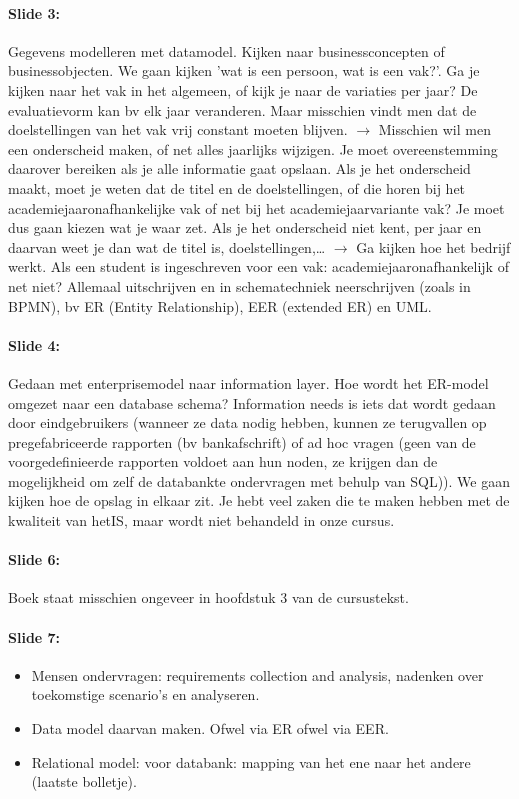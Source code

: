 \documentclass[10pt,a4paper]{report}
\begin{document}
\paragraph{Slide 3:}Gegevens modelleren met datamodel. Kijken naar businessconcepten of businessobjecten. We gaan kijken 'wat is een persoon, wat is een vak?'. Ga je kijken naar het vak in het algemeen, of kijk je naar de variaties per jaar? De evaluatievorm kan bv elk jaar veranderen. Maar misschien vindt men dat de doelstellingen van het vak vrij constant moeten blijven. $\rightarrow$ Misschien wil men een onderscheid maken, of net alles jaarlijks wijzigen. Je moet overeenstemming daarover bereiken als je alle informatie gaat opslaan. Als je het onderscheid maakt, moet je weten dat de titel en de doelstellingen, of die horen bij het academiejaaronafhankelijke vak of net bij het academiejaarvariante vak? Je moet dus gaan kiezen wat je waar zet. Als je het onderscheid niet kent, per jaar en daarvan weet je dan wat de titel is, doelstellingen,… $\rightarrow$ Ga kijken hoe het bedrijf werkt. Als een student is ingeschreven voor een vak: academiejaaronafhankelijk of net niet? Allemaal uitschrijven en in schematechniek neerschrijven (zoals in BPMN), bv ER (Entity Relationship), EER (extended ER) en UML.

\paragraph{Slide 4:}Gedaan met enterprisemodel naar information layer. Hoe wordt het ER-model omgezet naar een database schema? Information needs is iets dat wordt gedaan door eindgebruikers (wanneer ze data nodig hebben, kunnen ze terugvallen op pregefabriceerde rapporten (bv bankafschrift) of ad hoc vragen (geen van de voorgedefinieerde rapporten voldoet aan hun noden, ze krijgen dan de mogelijkheid om zelf de databankte ondervragen met behulp van SQL)). We gaan kijken hoe de opslag in elkaar zit. Je hebt veel zaken die te maken hebben met de kwaliteit van  hetIS, maar wordt niet behandeld in onze cursus.

\paragraph{Slide 6:}Boek staat misschien ongeveer in hoofdstuk 3 van de cursustekst.

\paragraph{Slide 7:}
\begin{itemize}
\item Mensen ondervragen: requirements collection and analysis, nadenken over toekomstige scenario's en analyseren.
\item Data model daarvan maken. Ofwel via ER ofwel via EER.
\item Relational model: voor databank: mapping van het ene naar het andere (laatste bolletje).
\end{itemize}
\end{document}
